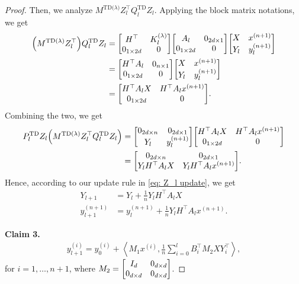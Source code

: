 \documentclass{article}
\newcommand{\indot}[2]{{\left<#1, #2\right>}}
\newcommand{\td}{\text{TD}}
\newcommand{\tdlambda}{\text{TD($\lambda$)}}
\begin{document}
\begin{proof}
    Then, we analyze $M^\tdlambda  Z_l^\top Q_l^{\td} Z_l$.
    Applying the block matrix notations, we get
    \begin{align}
        \qty(M^\tdlambda  Z_l^\top) Q_l^{\td} Z_l &= \mqty[H^\top & K_l^{(\lambda)}\\
                                 0_{1\times 2d} & 0]
                           \mqty[A_l & 0_{2d \times 1} \\ 
                                 0_{1 \times 2d} & 0]
                            \mqty[X & x^{(n+1)} \\ 
                                  Y_l & y_l^{(n+1)}]\\
                        &= \mqty[H^\top A_l & 0_{n \times 1}\\
                                 0_{1\times 2d} & 0]
                           \mqty[X & x^{(n+1)} \\ 
                                  Y_l & y_l^{(n+1)}]\\
                        &= \mqty[H^\top A_l X & H^\top A_l x^{(n+1)}\\
                                 0_{1\times 2d} & 0].
    \end{align}
    Combining the two, we get
    \begin{align}
        P_l^{\td} Z_l \qty(M^\tdlambda  Z_l^\top Q_l^{\td} Z_l) 
        &= \mqty[0_{2d \times n} & 0_{2d \times 1}\\
                        Y_l & y_l^{(n+1)}]
            \mqty[H^\top A_l X & H^\top A_l x^{(n+1)}\\
                                 0_{1\times 2d} & 0]\\
        &= \mqty[0_{2d \times n} & 0_{2d \times 1}\\
                 Y_l H^\top A_l X & Y_l H^\top A_l x^{(n+1)}].
    \end{align}
    Hence, according to our update rule in \eqref{eq: Z_l update}, we get 
    \begin{align}
        Y_{l+1} &= Y_l + \frac{1}{n} Y_l H^\top A_l X\\
        y_{l+1}^{(n+1)} &= y_l^{(n+1)} + \frac{1}{n} Y_l H^\top A_l x^{(n+1)}.
    \end{align}

    \textbf{Claim 3.}
    \begin{align}
      y_{l+1}^{(i)} = y_0^{(i)} + \indot{M_1 x^{(i)}}{\frac{1}{n}\sum_{i=0}^l B_i^\top M_2 X Y_i^\top},
    \end{align}
    for $i = 1, \dots, n+1$, where $M_2 = \mqty[I_{d} & 0_{d\times d}\\ 0_{d\times d} & 0_{d\times d}]$.


\end{proof}
\end{document}

